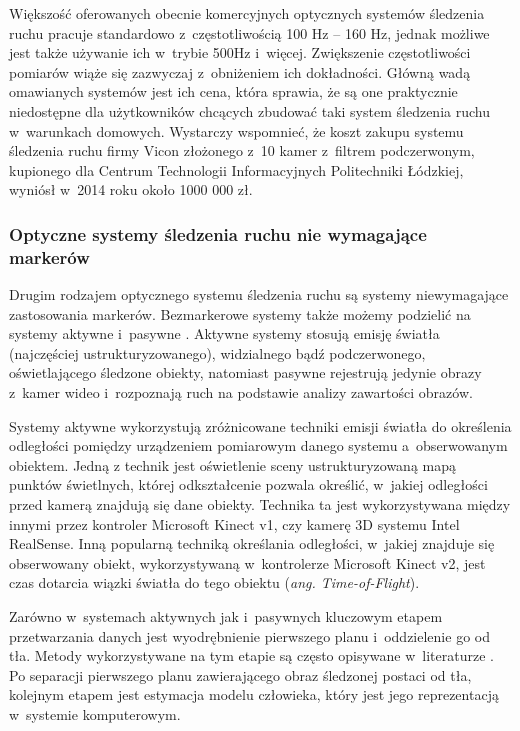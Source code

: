 Większość oferowanych obecnie komercyjnych optycznych systemów śledzenia ruchu pracuje standardowo z~częstotliwością 100 Hz -- 160 Hz, jednak możliwe jest także używanie ich w~trybie 500Hz i~więcej. Zwiększenie częstotliwości pomiarów wiąże się zazwyczaj z~obniżeniem ich dokładności.
Główną wadą omawianych systemów jest ich cena, która sprawia, że są one praktycznie niedostępne dla użytkowników chcących zbudować taki system śledzenia ruchu w~warunkach domowych. Wystarczy wspomnieć, że koszt zakupu systemu śledzenia ruchu firmy Vicon złożonego z~10 kamer z~filtrem podczerwonym, kupionego dla Centrum Technologii Informacyjnych Politechniki Łódzkiej,  wyniósł w~2014 roku około 1000 000 zł.
			 
\subsubsection*{Optyczne systemy śledzenia ruchu nie wymagające markerów}\label{chap:mocaps:Kinect}
Drugim rodzajem optycznego systemu śledzenia ruchu są systemy niewymagające zastosowania markerów. Bezmarkerowe systemy także możemy podzielić na systemy aktywne i~pasywne \cite{Mundermann2006}. Aktywne systemy stosują emisję światła (najczęściej ustrukturyzowanego), widzialnego bądź podczerwonego, oświetlającego śledzone obiekty, natomiast pasywne rejestrują jedynie obrazy z~kamer wideo i~rozpoznają ruch na podstawie analizy zawartości obrazów. 

Systemy aktywne wykorzystują zróżnicowane techniki emisji światła do określenia odległości pomiędzy urządzeniem pomiarowym danego systemu a~obserwowanym obiektem. Jedną z technik jest oświetlenie sceny ustrukturyzowaną mapą punktów świetlnych, której odkształcenie pozwala określić, w~jakiej odległości przed kamerą znajdują się dane obiekty. Technika ta jest wykorzystywana między innymi przez kontroler Microsoft Kinect v1{}, czy kamerę 3D systemu Intel RealSense{}. Inną popularną techniką określania odległości, w~jakiej znajduje się obserwowany obiekt, wykorzystywaną w~kontrolerze Microsoft Kinect v2{}, jest czas dotarcia wiązki światła do tego obiektu (\emph{ang. Time-of-Flight})\cite{Hansard2013}.
			
Zarówno w~systemach aktywnych jak i~pasywnych kluczowym etapem przetwarzania danych jest wyodrębnienie pierwszego planu i~oddzielenie go od tła. Metody wykorzystywane na tym etapie są często opisywane w~literaturze \cite{wang2003recent, rosenhahn2008markerless, guan2009estimating, surer2011markerless, corazza2006markerless}. Po separacji pierwszego planu zawierającego obraz śledzonej postaci od tła, kolejnym etapem jest estymacja modelu człowieka, który jest jego reprezentacją w~systemie komputerowym. 
			
